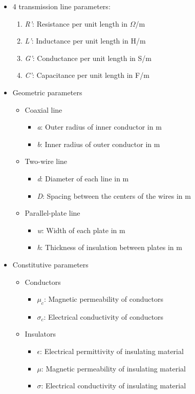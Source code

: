 \documentclass[a4paper]{article}
\begin{document}
\begin{itemize}
    \item 4 transmission line parameters:
    \begin{enumerate}
        \item \textit{R'}: Resistance per unit length in $\Omega$/m
        \item \textit{L'}: Inductance per unit length in H/m
        \item \textit{G'}: Conductance per unit length in S/m
        \item \textit{C'}: Capacitance per unit length in F/m
    \end{enumerate}
    \item Geometric parameters
    \begin{itemize}[label=$\circ$]
    \item Coaxial line
    \begin{itemize}[label=\tiny$\blacksquare$]
        \item \textit{a}: Outer radius of inner conductor in m
        \item \textit{b}: Inner radius of outer conductor in m
    \end{itemize}
    \item Two-wire line
    \begin{itemize}[label=\tiny$\blacksquare$]
        \item \textit{d}: Diameter of each line in m
        \item \textit{D}: Spacing between the centers of the wires in m
    \end{itemize}
    \item Parallel-plate line
    \begin{itemize}[label=\tiny$\blacksquare$]
        \item \textit{w}: Width of each plate in m
        \item \textit{h}: Thickness of insulation between plates in m
    \end{itemize}
    \end{itemize}
    \item Constitutive parameters
    \begin{itemize}[label=$\circ$]
    \item Conductors
    \begin{itemize}[label=\tiny$\blacksquare$]
        \item $\mu_c$: Magnetic permeability of conductors
        \item $\sigma_c$: Electrical conductivity of conductors
    \end{itemize}
    \item Insulators
    \begin{itemize}[label=\tiny$\blacksquare$]
        \item $\epsilon$: Electrical permittivity of insulating material
        \item $\mu$: Magnetic permeability of insulating material
        \item $\sigma$: Electrical conductivity of insulating material
    \end{itemize}
    \end{itemize}
\end{itemize}
\end{document}
